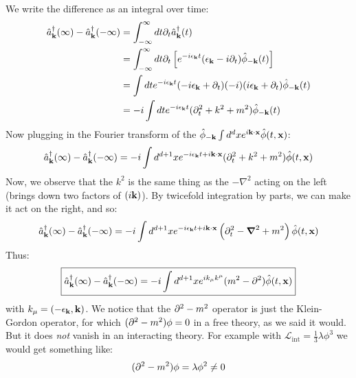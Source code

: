 We write the difference as an integral over time:
\begin{equation}
    \begin{split}
        \hat{a}^\dagger_{\mathbf{k}}(\infty) - \hat{a}_{\mathbf{k}}^\dagger(-\infty) &= \int_{-\infty}^\infty dt \partial_t \hat{a}^\dagger_{\mathbf{k}}(t) 
        \\ &= \int_{-\infty}^\infty dt \partial_t\left[e^{-i\epsilon_{\mathbf{k}}t}(\epsilon_{\mathbf{k}} - i\partial_t)\hat{\phi}_{-\mathbf{k}}(t)\right]
        \\ &=\int dt e^{-i\epsilon_{\mathbf{k}}t}(-i\epsilon_{\mathbf{k}} + \partial_t)(-i)(i\epsilon_{\mathbf{k}} + \partial_t)\hat{\phi}_{-\mathbf{k}}(t)
        \\ &= -i\int dt e^{-i\epsilon_{\mathbf{k}}t}(\partial_t^2 + k^2 + m^2)\hat{\phi}_{-\mathbf{k}}(t)
    \end{split}
\end{equation}
Now plugging in the Fourier transform of the $\hat{\phi}_{-\mathbf{k}}  \int d^dx e^{i\mathbf{k} \cdot \mathbf{x}}\hat{\phi}(t, \mathbf{x})$:
\begin{equation}
    \hat{a}^\dagger_{\mathbf{k}}(\infty) - \hat{a}_{\mathbf{k}}^\dagger(-\infty) = -i\int d^{d+1}x e^{-i\epsilon_{\mathbf{k}}t + i\mathbf{k} \cdot \mathbf{x}}(\partial_t^2 + k^2 + m^2)\hat{\phi}(t, \mathbf{x})
\end{equation}
Now, we observe that the $k^2$ is the same thing as the $-\nabla^2$ acting on the left (brings down two factors of $(i\mathbf{k})$). By twicefold integration by parts, we can make it act on the right, and so:
\begin{equation}
    \hat{a}^\dag_\v{k}(\infty) - \hat{a}_\v{k}^\dag(-\infty) = -i\int d^{d+1}x e^{-i\e_\v{k}t + i\v{k} \cdot \v{x}}\left(\p_t^2 - \nabla^2 + m^2\right)\hat{\phi}(t, \v{x})
\end{equation}
Thus:
\begin{equation}
    \boxed{\hat{a}^\dagger_{\mathbf{k}}(\infty) - \hat{a}_{\mathbf{k}}^\dagger(-\infty) = -i\int d^{d+1}x e^{ik_\mu k^\mu}(m^2 - \partial^2)\hat{\phi}(t, \mathbf{x})}
\end{equation}
with $k_\mu = (-\epsilon_{\mathbf{k}}, \mathbf{k})$. We notice that the $\partial^2 - m^2$ operator is just the Klein-Gordon operator, for which $(\partial^2-m^2)\phi = 0$ in a free theory, as we said it would. But it does \emph{not} vanish in an interacting theory. For example with $\mathcal{L}_{\text{int}} = \frac{1}{3}\lambda \phi^3$ we would get something like:
\begin{equation}
    (\partial^2 - m^2)\phi = \lambda \phi^2 \neq 0
\end{equation}

